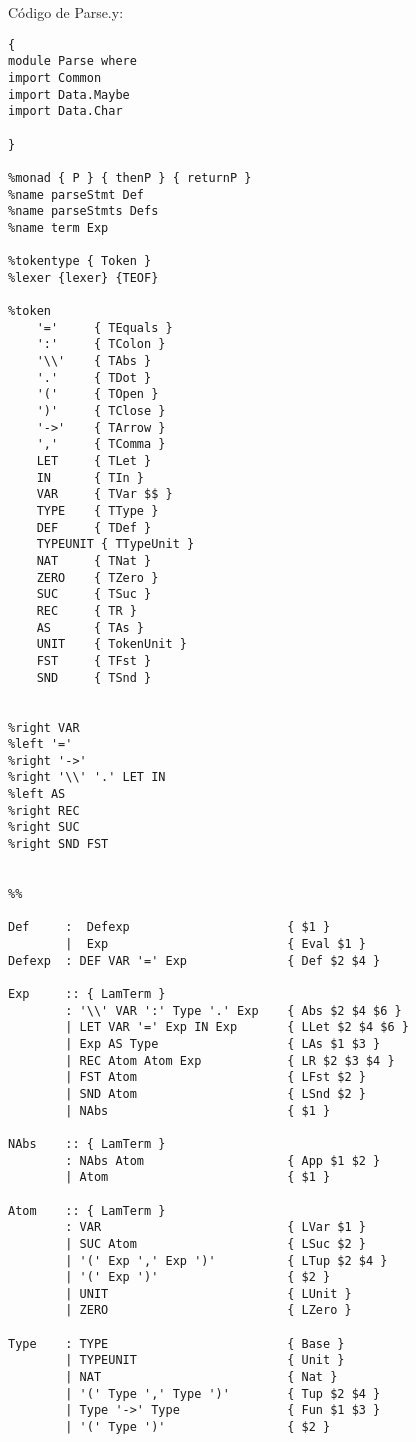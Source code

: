 \documentclass[12pt, a4paper]{article}
\begin{document}
Código de Parse.y:
\begin{Verbatim}
{
module Parse where
import Common
import Data.Maybe
import Data.Char

}

%monad { P } { thenP } { returnP }
%name parseStmt Def
%name parseStmts Defs
%name term Exp

%tokentype { Token }
%lexer {lexer} {TEOF}

%token
    '='     { TEquals }
    ':'     { TColon }
    '\\'    { TAbs }
    '.'     { TDot }
    '('     { TOpen }
    ')'     { TClose }
    '->'    { TArrow }
    ','     { TComma }
    LET     { TLet }
    IN      { TIn }
    VAR     { TVar $$ }
    TYPE    { TType }
    DEF     { TDef }
    TYPEUNIT { TTypeUnit }
    NAT     { TNat }
    ZERO    { TZero }
    SUC     { TSuc }
    REC     { TR }
    AS      { TAs }
    UNIT    { TokenUnit }
    FST     { TFst }
    SND     { TSnd }
    

%right VAR
%left '=' 
%right '->'
%right '\\' '.' LET IN
%left AS 
%right REC
%right SUC 
%right SND FST


%%

Def     :  Defexp                      { $1 }
        |  Exp	                       { Eval $1 }
Defexp  : DEF VAR '=' Exp              { Def $2 $4 } 

Exp     :: { LamTerm }
        : '\\' VAR ':' Type '.' Exp    { Abs $2 $4 $6 }
        | LET VAR '=' Exp IN Exp       { LLet $2 $4 $6 }
        | Exp AS Type                  { LAs $1 $3 }
        | REC Atom Atom Exp            { LR $2 $3 $4 }
        | FST Atom                     { LFst $2 }
        | SND Atom                     { LSnd $2 }
        | NAbs                         { $1 }
        
NAbs    :: { LamTerm }
        : NAbs Atom                    { App $1 $2 }
        | Atom                         { $1 }

Atom    :: { LamTerm }
        : VAR                          { LVar $1 }
        | SUC Atom                     { LSuc $2 }
        | '(' Exp ',' Exp ')'          { LTup $2 $4 }
        | '(' Exp ')'                  { $2 }
        | UNIT                         { LUnit }
        | ZERO                         { LZero }

Type    : TYPE                         { Base }
        | TYPEUNIT                     { Unit }
        | NAT                          { Nat } 
        | '(' Type ',' Type ')'        { Tup $2 $4 }
        | Type '->' Type               { Fun $1 $3 }
        | '(' Type ')'                 { $2 }


\end{Verbatim}
\end{document}
